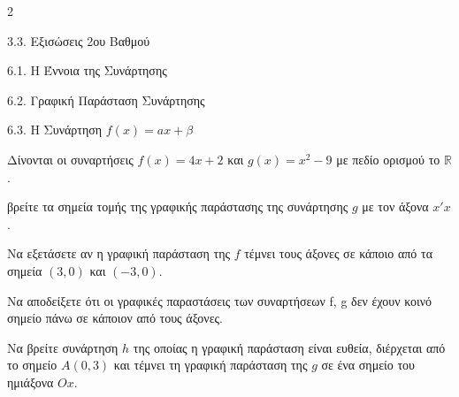 \begin{ylh}{2}
    \item 3.3. Εξισώσεις 2ου Βαθμού
    \item 6.1. Η Έννοια της Συνάρτησης
    \item 6.2. Γραφική Παράσταση Συνάρτησης
    \item 6.3. Η Συνάρτηση $f(x)=ax+\beta$
\end{ylh}
Δίνονται οι συναρτήσεις $f(x) = 4x + 2$ και $g(x) = x^2 - 9$ με πεδίο ορισμού το $\mathbb{R}$.

\begin{alist}
\item βρείτε τα σημεία τομής της γραφικής παράστασης της συνάρτησης $g$ με τον άξονα $x'x$.
\item Να εξετάσετε αν η γραφική παράσταση της $f$ τέμνει τους άξονες σε κάποιο από τα σημεία $(3, 0)$ και $(-3, 0)$.

\item Να αποδείξετε ότι οι γραφικές παραστάσεις των συναρτήσεων f, g δεν έχουν κοινό σημείο πάνω σε κάποιον από τους άξονες.
\item Να βρείτε συνάρτηση $h$ της οποίας η γραφική παράσταση είναι ευθεία, διέρχεται από το σημείο ${A}(0, 3)$ και τέμνει τη γραφική παράσταση της $g$ σε ένα σημείο του ημιάξονα $Ox$.

\end{alist}

